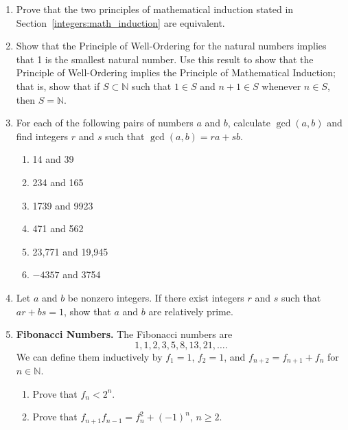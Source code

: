 {\begin{enumerate}
\item
Prove that the two principles of mathematical induction stated in Section~\ref{integers:math_induction} are equivalent. 

\item
Show that the Principle of Well-Ordering for the natural numbers implies that 1 is the smallest natural number.  Use this result to show that the Principle of Well-Ordering implies the Principle of Mathematical Induction; that is, show that if $S \subset {\mathbb N}$ such that $1 \in S$ and $n + 1 \in S$ whenever $n \in S$, then $S = {\mathbb N}$.  

\item
For each of the following pairs of numbers $a$ and $b$, calculate $\gcd(a,b)$ and find integers $r$ and $s$ such that  $\gcd(a,b) = ra + sb$. 
\begin{multicols}{2}
\begin{enumerate}

\item 
14 and 39

\item
234 and 165

\item
1739 and 9923

\item
471 and 562

\item
23,771 and 19,945

\item
$-4357$ and 3754

\end{enumerate}
\end{multicols}
 
\item 
Let $a$ and $b$ be nonzero integers. If there exist integers $r$ and $s$ such that $ar +bs =1$, show that $a$ and $b$ are relatively prime. 
 
 
\item
\textbf{Fibonacci Numbers.}
The Fibonacci numbers are
\[
1, 1, 2, 3, 5, 8, 13, 21, \ldots.
\]
We can define them inductively by $f_1 = 1$, $f_2 = 1$, and $f_{n + 2} = f_{n + 1} + f_n$ for $n \in {\mathbb N}$. 
\begin{enumerate}
 
 \item
Prove that $f_n < 2^n$.
 
 \item
Prove that $f_{n + 1} f_{n - 1} = f^2_n + (-1)^n$, $n \geq 2$.
 

\end{enumerate}
\end{enumerate}}
